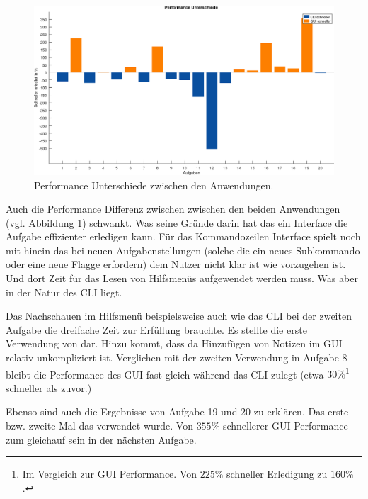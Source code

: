 \documentclass[oneside,bibliography=totocnumbered,BCOR=5mm]{scrbook}
\begin{document}
\medskip

\begin{figure}[H]
  \centering
  \includegraphics[scale=0.36]{performance-diff.png}
  \caption{Performance Unterschiede zwischen den Anwendungen.}
  \label{fig:performance-diff}
\end{figure}

Auch die Performance Differenz zwischen zwischen den beiden Anwendungen (vgl.
Abbildung \ref{fig:performance-diff}) schwankt. Was seine Gründe darin hat das
ein Interface die Aufgabe effizienter erledigen kann. Für das Kommandozeilen
Interface spielt noch mit hinein das bei neuen Aufgabenstellungen (solche die
ein neues Subkommando oder eine neue Flagge erfordern) dem Nutzer nicht klar
ist wie vorzugehen ist. Und dort Zeit für das Lesen von Hilfsmenüs aufgewendet
werden muss. Was aber in der Natur des CLI liegt.

\medskip

Das Nachschauen im Hilfsmenü beispielsweise auch wie das CLI bei der zweiten
Aufgabe die dreifache Zeit zur Erfüllung brauchte. Es stellte die erste
Verwendung von  dar. Hinzu kommt, dass da Hinzufügen von
Notizen im GUI relativ unkompliziert ist. Verglichen mit der zweiten Verwendung
in Aufgabe 8 bleibt die Performance des GUI fast gleich während das CLI zulegt
(etwa $30\%$\footnote{Im Vergleich zur GUI Performance. Von $225\%$ schneller
Erledigung zu $160\%$.} schneller als zuvor.)

\medskip

Ebenso sind auch die Ergebnisse von Aufgabe 19 und 20 zu erklären. Das erste
bzw. zweite Mal das  verwendet wurde. Von $355\%$
schnellerer GUI Performance zum gleichauf sein in der nächsten Aufgabe.

\medskip
\end{document}
